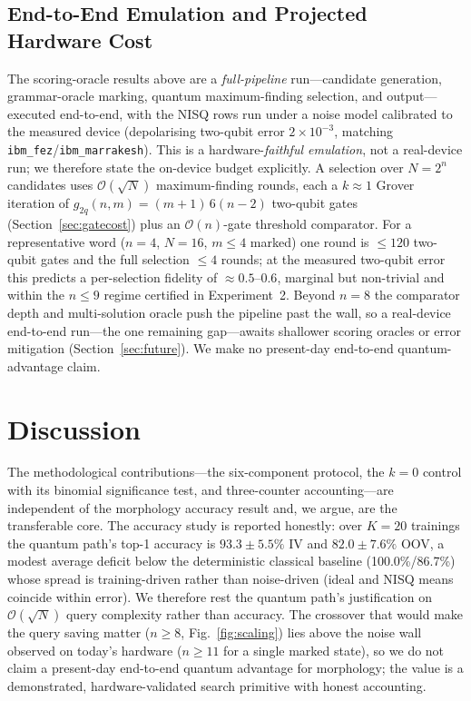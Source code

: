 \documentclass[journal]{IEEEtran}
\newcommand{\bigO}{\mathcal{O}}
\newcommand{\sqrtN}{\sqrt{N}}
\begin{document}
\subsection{End-to-End Emulation and Projected Hardware Cost}
\label{sec:e2e}
The scoring-oracle results above are a \emph{full-pipeline} run---candidate
generation, grammar-oracle marking, quantum maximum-finding selection, and
output---executed end-to-end, with the NISQ rows run under a noise model
calibrated to the measured device (depolarising two-qubit error
$2\times10^{-3}$, matching \texttt{ibm\_fez}/\texttt{ibm\_marrakesh}). This is a
hardware-\emph{faithful emulation}, not a real-device run; we therefore state the on-device budget explicitly. A
selection over $N{=}2^{n}$ candidates uses $\bigO(\sqrtN)$ maximum-finding rounds,
each a $k{\approx}1$ Grover iteration of $g_{2q}(n,m)=(m{+}1)\,6(n{-}2)$ two-qubit
gates (Section~\ref{sec:gatecost}) plus an $\bigO(n)$-gate threshold comparator.
For a representative word ($n{=}4$, $N{=}16$, $m{\le}4$ marked) one round is
$\le120$ two-qubit gates and the full selection $\le4$ rounds; at the measured
two-qubit error this predicts a per-selection fidelity of $\approx0.5$--$0.6$,
marginal but non-trivial and within the $n{\le}9$ regime certified in
Experiment~2. Beyond $n{=}8$ the comparator depth and multi-solution oracle push
the pipeline past the wall, so a real-device end-to-end run---the one remaining
gap---awaits shallower scoring oracles or error mitigation
(Section~\ref{sec:future}). We make no present-day end-to-end quantum-advantage
claim.


\section{Discussion}
The methodological contributions---the six-component protocol, the $k{=}0$
control with its binomial significance test, and three-counter accounting---are
independent of the morphology accuracy result and, we argue, are the transferable
core. The accuracy study is reported honestly: over $K{=}20$ trainings the
quantum path's top-1 accuracy is $93.3\pm5.5\%$ IV and $82.0\pm7.6\%$ OOV, a
modest average deficit below the deterministic classical baseline
(100.0\%/86.7\%) whose spread is training-driven rather than noise-driven (ideal
and NISQ means coincide within error). We therefore rest the quantum path's
justification on $\bigO(\sqrtN)$ query complexity rather than accuracy. The
crossover that would make the query saving matter ($n\!\ge\!8$,
Fig.~\ref{fig:scaling}) lies above the noise wall observed on today's hardware
($n\!\ge\!11$ for a single marked state), so we do not claim a present-day
end-to-end quantum advantage for morphology; the value is a demonstrated,
hardware-validated search primitive with honest accounting.
\end{document}
